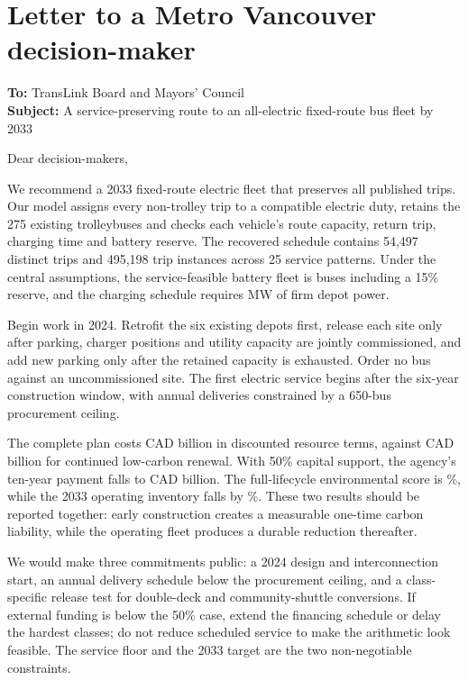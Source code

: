\documentclass[12pt,letterpaper]{article}
\begin{document}
\clearpage
{}
\section*{Letter to a Metro Vancouver decision-maker}
\textbf{To:} TransLink Board and Mayors' Council\\
\textbf{Subject:} A service-preserving route to an all-electric fixed-route bus fleet by 2033

Dear decision-makers,

We recommend a 2033 fixed-route electric fleet that preserves all published trips. Our model assigns every non-trolley trip to a compatible electric duty, retains the 275 existing trolleybuses and checks each vehicle's route capacity, return trip, charging time and battery reserve. The recovered schedule contains 54,497 distinct trips and 495,198 trip instances across 25 service patterns. Under the central assumptions, the service-feasible battery fleet is  buses including a 15\% reserve, and the charging schedule requires  MW of firm depot power.

Begin work in 2024. Retrofit the six existing depots first, release each site only after parking, charger positions and utility capacity are jointly commissioned, and add new parking only after the retained capacity is exhausted. Order no bus against an uncommissioned site. The first electric service begins after the six-year construction window, with annual deliveries constrained by a 650-bus procurement ceiling.

The complete plan costs CAD  billion in discounted resource terms, against CAD  billion for continued low-carbon renewal. With 50\% capital support, the agency's ten-year payment falls to CAD  billion. The full-lifecycle environmental score is \%, while the 2033 operating inventory falls by \%. These two results should be reported together: early construction creates a measurable one-time carbon liability, while the operating fleet produces a durable reduction thereafter.

We would make three commitments public: a 2024 design and interconnection start, an annual delivery schedule below the procurement ceiling, and a class-specific release test for double-deck and community-shuttle conversions. If external funding is below the 50\% case, extend the financing schedule or delay the hardest classes; do not reduce scheduled service to make the arithmetic look feasible. The service floor and the 2033 target are the two non-negotiable constraints.
\end{document}
